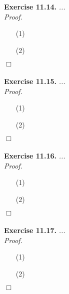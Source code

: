 \documentclass{article}
\begin{document}



\textbf{Exercise 11.14.}
\emph{...} \\

\emph{Proof.}
\begin{enumerate}
\item[(1)]
\item[(2)]

\end{enumerate}
$\Box$ \\\\






\textbf{Exercise 11.15.}
\emph{...} \\

\emph{Proof.}
\begin{enumerate}
\item[(1)]
\item[(2)]

\end{enumerate}
$\Box$ \\\\






\textbf{Exercise 11.16.}
\emph{...} \\

\emph{Proof.}
\begin{enumerate}
\item[(1)]
\item[(2)]

\end{enumerate}
$\Box$ \\\\






\textbf{Exercise 11.17.}
\emph{...} \\

\emph{Proof.}
\begin{enumerate}
\item[(1)]
\item[(2)]

\end{enumerate}
$\Box$ \\\\
\end{document}
